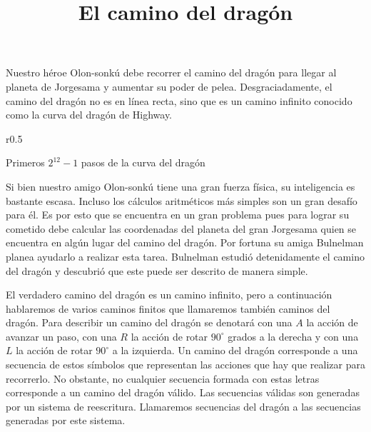 \documentclass{oci}
\title{El camino del drag\'on}
\begin{document}
\maketitle
Nuestro héroe Olon-sonkú debe recorrer el camino del dragón para llegar al planeta de Jorgesama y aumentar su poder de pelea. Desgraciadamente, el camino del dragón no es en línea recta, sino que es un camino infinito conocido como la curva del dragón de Highway.


\begin{wrapfigure}{r}{0.5\textwidth}
	\begin{center}
			
		Primeros $2^{12}-1$ pasos de la curva del dragón
	\end{center}
\end{wrapfigure}

Si bien nuestro amigo Olon-sonkú tiene una gran fuerza física, su inteligencia es bastante escasa.
Incluso los cálculos aritméticos más simples son un gran desafío para él.
Es por esto que se encuentra en un gran problema pues para lograr su cometido debe calcular las coordenadas del planeta del gran Jorgesama quien se encuentra en algún lugar del camino del dragón.
Por fortuna su amiga Bulnelman planea ayudarlo a realizar esta tarea.
Bulnelman estudió detenidamente el camino del dragón y descubrió que este puede ser descrito de manera simple.

El verdadero camino del dragón es un camino infinito, pero a continuación hablaremos de varios caminos finitos que llamaremos también caminos del dragón.
Para describir un camino del dragón se denotará con una $A$ la acción de avanzar un paso, con una $R$ la acción de rotar $90^{\circ}$ grados a la derecha y con una $L$ la acción de rotar $90^{\circ}$ a la izquierda.
Un camino del dragón corresponde a una secuencia de estos símbolos que representan las acciones que hay que realizar para recorrerlo.
No obstante, no cualquier secuencia formada con estas letras corresponde a un camino del dragón válido.
Las secuencias válidas son generadas por un sistema de reescritura.
Llamaremos secuencias del dragón a las secuencias generadas por este sistema.
\end{document}
